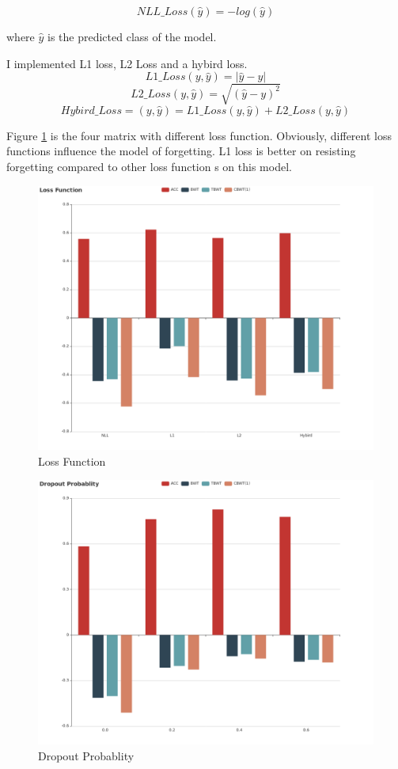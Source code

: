 \documentclass{article}
\begin{document}
$$NLL\_Loss(\hat{y}) = -log(\hat{y})$$

where $\hat{y}$ is the predicted class of the model.

I implemented L1 loss, L2 Loss and a hybird loss.
$$L1\_Loss(y, \hat{y}) = |\hat{y} - y|$$
$$L2\_Loss(y, \hat{y}) = \sqrt{(\hat{y} - y)^2}$$
$$Hybird\_Loss = (y, \hat{y}) =  L1\_Loss(y, \hat{y}) + L2\_Loss(y, \hat{y}) $$

Figure \ref{loss} is the four matrix with different loss function. Obviously, different loss functions influence the model of forgetting. L1 loss is better on resisting forgetting compared to other loss function s on this model.

\begin{figure}[htbp]
\centering
\includegraphics[scale=0.3]{img/LossFunction.png}
\caption{Loss Function}
\label{loss}
\end{figure}

\begin{figure}[htbp]
\centering
\includegraphics[scale=0.3]{img/DropoutProbablity.png}
\caption{Dropout Probablity}
\label{dropout}
\end{figure}
\end{document}
